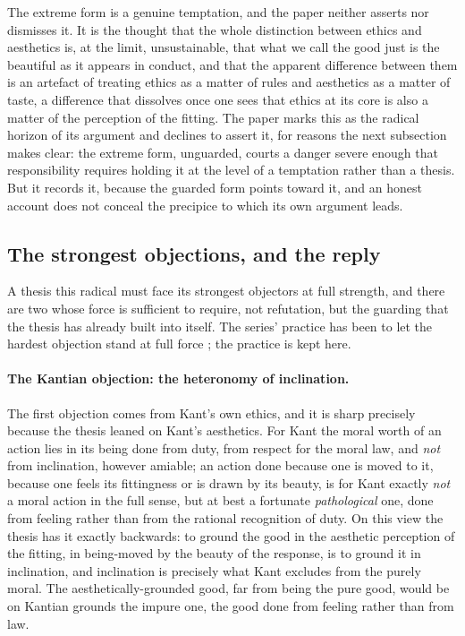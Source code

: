 \noindent
The extreme form is a genuine temptation, and the paper neither asserts nor dismisses it. It is the thought that the whole distinction between ethics and aesthetics is, at the limit, unsustainable, that what we call the good just is the beautiful as it appears in conduct, and that the apparent difference between them is an artefact of treating ethics as a matter of rules and aesthetics as a matter of taste, a difference that dissolves once one sees that ethics at its core is also a matter of the perception of the fitting. The paper marks this as the radical horizon of its argument and declines to assert it, for reasons the next subsection makes clear: the extreme form, unguarded, courts a danger severe enough that responsibility requires holding it at the level of a temptation rather than a thesis. But it records it, because the guarded form points toward it, and an honest account does not conceal the precipice to which its own argument leads.

\subsection{The strongest objections, and the reply}
\label{p21:sub:ae-objections}

A thesis this radical must face its strongest objectors at full strength, and there are two whose force is sufficient to require, not refutation, but the guarding that the thesis has already built into itself. The series' practice has been to let the hardest objection stand at full force \parencite{paperxx}; the practice is kept here.

\paragraph{The Kantian objection: the heteronomy of inclination.}
The first objection comes from Kant's own ethics, and it is sharp precisely because the thesis leaned on Kant's aesthetics. For Kant the moral worth of an action lies in its being done from duty, from respect for the moral law, and \emph{not} from inclination, however amiable; an action done because one is moved to it, because one feels its fittingness or is drawn by its beauty, is for Kant exactly \emph{not} a moral action in the full sense, but at best a fortunate \emph{pathological} one, done from feeling rather than from the rational recognition of duty. On this view the thesis has it exactly backwards: to ground the good in the aesthetic perception of the fitting, in being-moved by the beauty of the response, is to ground it in inclination, and inclination is precisely what Kant excludes from the purely moral. The aesthetically-grounded good, far from being the pure good, would be on Kantian grounds the impure one, the good done from feeling rather than from law.

